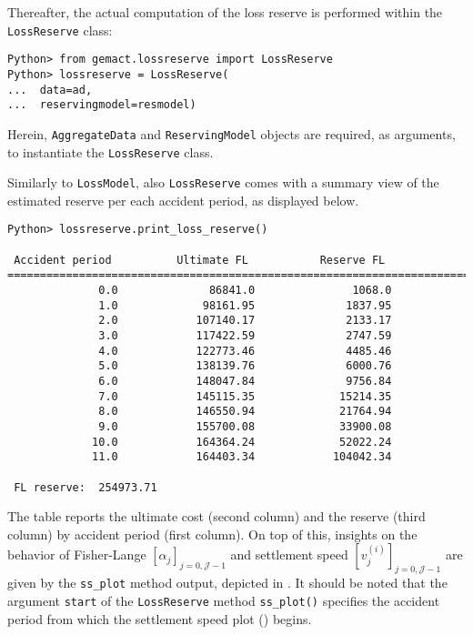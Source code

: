 \documentclass{article}
\begin{document}
Thereafter, the actual computation of the loss reserve is performed within the \texttt{LossReserve} class:

\begin{lstlisting}
Python> from gemact.lossreserve import LossReserve
Python> lossreserve = LossReserve(
...  data=ad,
...  reservingmodel=resmodel)
\end{lstlisting}

Herein, \texttt{AggregateData} and \texttt{ReservingModel} objects are required, as arguments, to instantiate the \texttt{LossReserve} class.

Similarly to \texttt{LossModel}, also \texttt{LossReserve} comes with a summary view of the estimated reserve per each accident period, as displayed below.

\begin{lstlisting}
Python> lossreserve.print_loss_reserve()

 Accident period          Ultimate FL           Reserve FL
=============================================================================
              0.0              86841.0               1068.0
              1.0             98161.95              1837.95
              2.0            107140.17              2133.17
              3.0            117422.59              2747.59
              4.0            122773.46              4485.46
              5.0            138139.76              6000.76
              6.0            148047.84              9756.84
              7.0            145115.35             15214.35
              8.0            146550.94             21764.94
              9.0            155700.08             33900.08
             10.0            164364.24             52022.24
             11.0            164403.34            104042.34

 FL reserve:  254973.71
\end{lstlisting}

The table reports the ultimate cost (second column) and the reserve (third column) by accident period (first column).
On top of this, insights on the behavior of Fisher-Lange $\left[\alpha_j\right]_{j=0, \mathcal{J}-1}$ and settlement speed $\left[v^{(i)}_j\right]_{j=0, \mathcal{J}-1}$ are given by the \texttt{ss\_plot} method output, depicted in . It should be noted that the argument \texttt{start} of the \texttt{LossReserve} method \texttt{ss\_plot()} specifies the accident period from which the settlement speed plot () begins.
\end{document}
